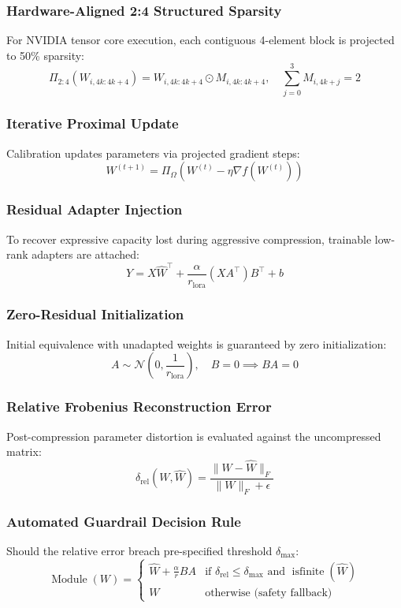 \subsubsection{Hardware-Aligned 2:4 Structured Sparsity}
For NVIDIA tensor core execution, each contiguous 4-element block is projected to 50\% sparsity:
\[
\Pi_{2:4}(W_{i, 4k:4k+4}) = W_{i, 4k:4k+4} \odot M_{i, 4k:4k+4}, \quad \sum_{j=0}^{3} M_{i, 4k+j} = 2
\]

\subsubsection{Iterative Proximal Update}
Calibration updates parameters via projected gradient steps:
\[
W^{(t+1)} = \Pi_{\Omega}\left( W^{(t)} - \eta \nabla f(W^{(t)}) \right)
\]

\subsubsection{Residual Adapter Injection}
To recover expressive capacity lost during aggressive compression, trainable low-rank adapters are attached:
\[
Y = X \hat{W}^\top + \frac{\alpha}{r_{\text{lora}}} (X A^\top) B^\top + b
\]

\subsubsection{Zero-Residual Initialization}
Initial equivalence with unadapted weights is guaranteed by zero initialization:
\[
A \sim \mathcal{N}\left(0, \frac{1}{r_{\text{lora}}}\right), \quad B = 0 \implies B A = 0
\]

\subsubsection{Relative Frobenius Reconstruction Error}
Post-compression parameter distortion is evaluated against the uncompressed matrix:
\[
\delta_{\text{rel}}(W, \hat{W}) = \frac{\|W - \hat{W}\|_F}{\|W\|_F + \epsilon}
\]

\subsubsection{Automated Guardrail Decision Rule}
Should the relative error breach pre-specified threshold $\delta_{\text{max}}$:
\[
\operatorname{Module}(W) = \begin{cases} \hat{W} + \frac{\alpha}{r} B A & \text{if } \delta_{\text{rel}} \le \delta_{\text{max}} \text{ and } \operatorname{isfinite}(\hat{W}) \\ W & \text{otherwise (safety fallback)} \end{cases}
\]

